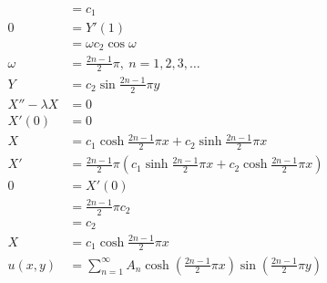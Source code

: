 \documentclass{article}
\begin{document}
\begin{align*}
                    & = c_1                                                                                                              \\
  0                 & = Y'(1)                                                                                                            \\
                    & = \omega c_2 \cos \omega                                                                                           \\
  \omega            & = \frac{2 n - 1}{2} \pi,\ n = 1, 2, 3, \ldots                                                                      \\
  Y                 & = c_2 \sin \frac{2 n - 1}{2} \pi y                                                                                 \\
  X'' - \lambda X   & = 0                                                                                                                \\
  X'(0)             & = 0                                                                                                                \\
  X                 & = c_1 \cosh \frac{2 n - 1}{2} \pi x + c_2 \sinh \frac{2 n - 1}{2} \pi x                                            \\
  X'                & = \frac{2 n - 1}{2} \pi \left( c_1 \sinh \frac{2 n - 1}{2} \pi x + c_2 \cosh \frac{2 n - 1}{2} \pi x \right)       \\
  0                 & = X'(0)                                                                                                            \\
                    & = \frac{2 n - 1}{2} \pi c_2                                                                                        \\
                    & = c_2                                                                                                              \\
  X                 & = c_1 \cosh \frac{2 n - 1}{2} \pi x                                                                                \\
  u(x, y)           & = \sum_{n = 1}^\infty A_n \cosh \left( \frac{2 n - 1}{2} \pi x \right) \sin \left( \frac{2 n - 1}{2} \pi y \right)
\end{align*}
\end{document}
